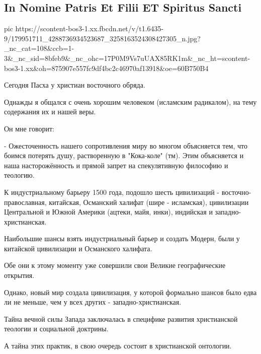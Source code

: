  
 
 
 
 
\subsection{In Nomine Patris Et Filii ET Spiritus Sancti}
\label{sec:02_05_2021.fb.arestovich_aleksei.1.hristos_pas_ha}

\ifcmt
  pic https://scontent-bos3-1.xx.fbcdn.net/v/t1.6435-9/179951711_4288736934523687_3258163524308427305_n.jpg?_nc_cat=108&ccb=1-3&_nc_sid=8bfeb9&_nc_ohc=17P0M9Vs7uUAX85RK1m&_nc_ht=scontent-bos3-1.xx&oh=875907e557fc9df4bc2c46970af13918&oe=60B750B4
\fi

Сегодня Пасха у христиан восточного обряда. 

Однажды я общался с очень хорошим человеком (исламским радикалом), на тему содержания их и нашей веры.

Он мне говорит:

- Ожесточенность нашего сопротивления миру во многом объясняется тем, что
боимся потерять душу, растворенную в "Кока-коле" (тм).  Этим объясняется и наша
насторожённость и прямой запрет на спекулятивную философию и теологию.

К индустриальному барьеру 1500 года, подошло шесть цивилизаций -
восточно-православная, китайская, Османский халифат (шире - исламская),
цивилизации Центральной и Южной Америки (ацтеки, майя, инки), индийская и
западно-христианская. 

Наибольшие шансы взять индустриальный барьер и создать Модерн, были у китайской
цивилизации и Османского халифата.

Обе они к этому моменту уже совершили свои Великие географические открытия.

Однако, новый мир создала цивилизация, у которой формально шансов было едва ли
не меньше, чем у всех других - западно-христианская.

Тайна вечной силы Запада заключалась в специфике развития христианской теологии
и социальной доктрины. 

А тайна этих практик, в свою очередь состоит в христианской онтологии.

